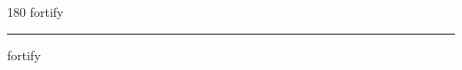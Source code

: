 
\begin{frame}
\begin{center}
\begin{turn}{180}
{\fontsize{2.5cm}{1em}\selectfont fortify}
\end{turn}
\vspace{1em}\par  
\hrule
\vspace{1em}\par  
{\fontsize{2.5cm}{1em}\selectfont fortify}
\end{center}
\end{frame}

